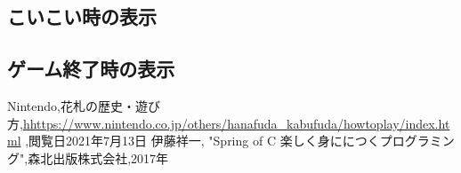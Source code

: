 \documentclass[a4j]{jarticle}
\begin{document}
    \subsection{こいこい時の表示}
    \subsection{ゲーム終了時の表示}

        \begin{thebibliography}{9}
            Nintendo,花札の歴史・遊び方,\url{hhttps://www.nintendo.co.jp/others/hanafuda_kabufuda/howtoplay/index.html} ,閲覧日2021年7月13日
            伊藤祥一, "Spring of C 楽しく身ににつくプログラミング",森北出版株式会社,2017年
        \end{thebibliography}
\end{document}
